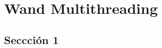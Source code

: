 
\chapter{Wand Multithreading}
\label{capitulo:wandmth}



\section{Seccción 1}
\label{session1:primeraseccion}











